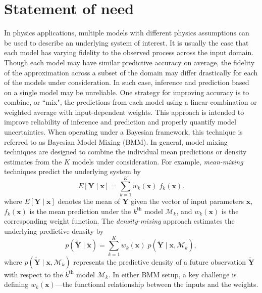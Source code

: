 \documentclass[10pt, preprint,aps,prc,floatfix,
tightenlines,
nofootinbib,superscriptaddress]{revtex4-2}
\newcommand{\M}{\mathcal{M}}
\newcommand{\xvec}{\boldsymbol x}
\begin{document}
\section{Statement of need}

In physics applications, multiple models with different physics assumptions can be used to describe an underlying system of interest. It is usually the case that each model has varying fidelity to the observed process across the input domain. Though each model may have similar predictive accuracy on average, the fidelity of the approximation across a subset of the domain may differ drastically for each of the models under consideration. In such case, inference and prediction based on a single model may be unreliable. One strategy for improving accuracy is to combine, or  ``mix", the predictions from each model using a linear combination or weighted average with input-dependent weights. This approach is intended to improve reliability of inference and prediction and properly quantify model uncertainties. When operating under a Bayesian framework, this technique is referred to as Bayesian Model Mixing (BMM). In general, model mixing techniques are designed to combine the individual mean predictions or density estimates from the $K$ models under consideration.
For example, \textit{mean-mixing} techniques predict the underlying system by 
\begin{equation}
    E[\bm Y \mid \xvec] = \sum_{k = 1}^K w_k(\xvec)\; f_k(\xvec).
\end{equation}
where $E[\bm Y\mid\xvec]$ denotes the mean of $\bm Y$ given the vector of input parameters $\bm x$, $f_k(\xvec)$ is the mean prediction under the $k^\mathrm{th}$ model $\mathcal{M}_k$, and $w_k(\xvec)$ is the corresponding weight function. The \textit{density-mixing} approach estimates the underlying predictive density by
\begin{equation}
    p(\bm{\tilde{Y}} \mid \tilde{\xvec}) = \sum_{k = 1}^K w_k(\xvec)\;p(\bm{\tilde{Y}} \mid \xvec, \M_k),
\end{equation}
where $p(\bm{\tilde{Y}} \mid \xvec, \M_k)$ represents the predictive density of a future observation $\bm{\tilde{Y}}$ with respect to the $k^\mathrm{th}$ model $\mathcal{M}_k$. In either BMM setup, a key challenge is defining $w_k(\xvec)$---the functional relationship between the inputs and the weights. 
\end{document}

